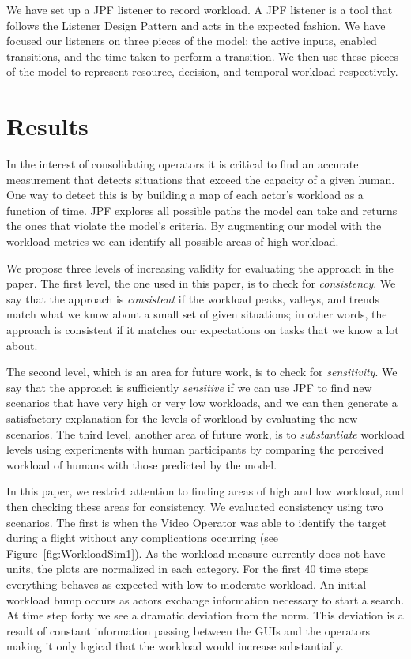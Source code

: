 We have set up a JPF listener to record workload. A JPF listener is a tool that
follows the Listener Design Pattern and acts in the expected fashion. We have
focused our listeners on three pieces of the model: the active inputs, enabled
transitions, and the time taken to perform a transition. We then use these
pieces of the model to represent resource, decision, and temporal workload respectively.

\section{Results}

In the interest of consolidating operators it is critical to find an accurate measurement that detects situations that exceed the capacity of a given human. One way to detect this is by building a map of each actor's workload as a function of time. JPF explores all possible paths the model can take and returns the ones that violate the model's criteria. By augmenting our model with the workload metrics we can identify all possible areas of high workload. 

We propose three levels of increasing validity for evaluating the approach in the paper.  The first level, the one used in this paper, is to check for {\em consistency}.  We say that the approach is {\em consistent} if the workload peaks, valleys, and trends match what we know about a small set of given situations; in other words, the approach is consistent if it matches our expectations on tasks that we know a lot about.  

The second level, which is an area for future work, is to check for {\em sensitivity}.  We say that  the approach is sufficiently {\em sensitive} if we can use JPF to find new scenarios that have very high or very low workloads, and we can then generate a satisfactory explanation for the levels of workload by evaluating the new scenarios.  The third level, another area of future work, is to {\em substantiate} workload levels using experiments with human participants by comparing the perceived workload of humans with those predicted by the model.

In this paper, we restrict attention to finding areas of high and low workload, and then checking these areas for consistency.  We evaluated consistency using two scenarios.  The first is when the Video Operator was able to identify the target during a flight without any complications occurring (see Figure~\ref{fig:WorkloadSim1}). As the workload measure currently does not have units, the plots are normalized in each category. For the first 40 time steps everything behaves as expected with low to moderate workload. An initial workload bump occurs as actors exchange information necessary to start a search.   At time step forty we see a dramatic deviation from the norm. This deviation is a result of constant information passing between the GUIs and the operators
making it only
 logical that the workload would increase substantially.

